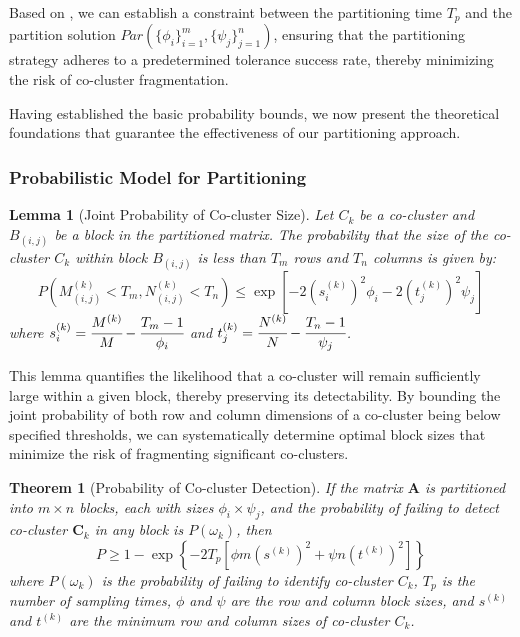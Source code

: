 \documentclass[journal]{IEEEtran}
\newtheorem{theorem}{Theorem}
\newtheorem{lemma}{Lemma}
\begin{document}
Based on , we can establish a constraint between the partitioning time $T_p$ and the partition solution $Par(\{\phi_i\}_{i=1}^m, \{\psi_j\}_{j=1}^n)$, ensuring that the partitioning strategy adheres to a predetermined tolerance success rate, thereby minimizing the risk of co-cluster fragmentation.

Having established the basic probability bounds, we now present the theoretical foundations that guarantee the effectiveness of our partitioning approach.

\subsubsection{Probabilistic Model for Partitioning}
\label{subsec:probabilistic_model}
\begin{lemma}[Joint Probability of Co-cluster Size]
    \label{thm:joint_probability}
    Let $C_k$ be a co-cluster and $B_{(i,j)}$ be a block in the partitioned matrix. The probability that the size of the co-cluster $C_k$ within block $B_{(i,j)}$ is less than $T_m$ rows and $T_n$ columns is given by:
    \begin{equation}
        P(M_{(i,j)}^{(k)} < T_m, N_{(i,j)}^{(k)} < T_n) \leq \exp\left[-2 (s_i^{(k)})^2 \phi_i -2 (t_j^{(k)})^2 \psi_j\right]
    \end{equation}
    where $s_i^{(k)} = \cfrac{M^{(k)}}{M} - \cfrac{T_m-1}{\phi_i}$ and $t_j^{(k)} = \cfrac{N^{(k)}}{N} - \cfrac{T_n-1}{\psi_j}$.
\end{lemma}

This lemma quantifies the likelihood that a co-cluster will remain sufficiently large within a given block, thereby preserving its detectability. By bounding the joint probability of both row and column dimensions of a co-cluster being below specified thresholds, we can systematically determine optimal block sizes that minimize the risk of fragmenting significant co-clusters.

\begin{theorem}[Probability of Co-cluster Detection]
    \label{thm:probability_co_cluster_detection}
    If the matrix $\mathbf{A}$ is partitioned into $m \times n$ blocks, each with sizes $\phi_i \times \psi_j$, and the probability of failing to detect co-cluster $\mathbf{C}_k$ in any block is $P(\omega_k)$, then
    \begin{equation}
        P \geq 1 - \exp \left\{ -2 T_p \left[ \phi m (s^{(k)})^2 + \psi n (t^{(k)})^2 \right] \right\}
    \end{equation}
    where $P(\omega_k)$ is the probability of failing to identify co-cluster $C_k$, $T_p$ is the number of sampling times, $\phi$ and $\psi$ are the row and column block sizes, and $s^{(k)}$ and $t^{(k)}$ are the minimum row and column sizes of co-cluster $C_k$.
\end{theorem}
\end{document}
